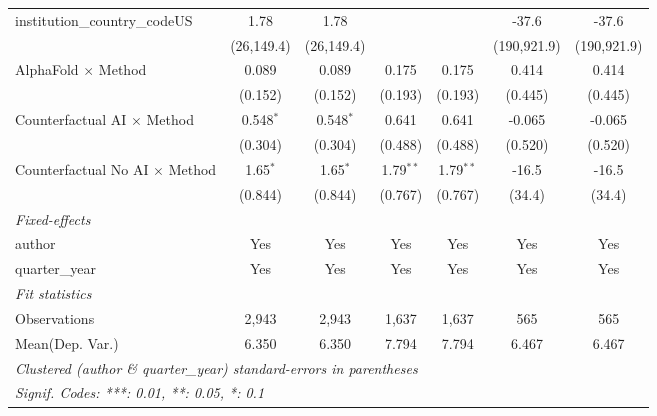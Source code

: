 \begin{tabular}{lcccccc}
   institution\_country\_codeUS          & 1.78         & 1.78         &               &               & -37.6       & -37.6\\   
                                         & (26,149.4)   & (26,149.4)   &               &               & (190,921.9) & (190,921.9)\\   
   AlphaFold $\times$ Method             & 0.089        & 0.089        & 0.175         & 0.175         & 0.414       & 0.414\\   
                                         & (0.152)      & (0.152)      & (0.193)       & (0.193)       & (0.445)     & (0.445)\\   
   Counterfactual AI $\times$ Method     & 0.548$^{*}$  & 0.548$^{*}$  & 0.641         & 0.641         & -0.065      & -0.065\\   
                                         & (0.304)      & (0.304)      & (0.488)       & (0.488)       & (0.520)     & (0.520)\\   
   Counterfactual No AI $\times$ Method  & 1.65$^{*}$   & 1.65$^{*}$   & 1.79$^{**}$   & 1.79$^{**}$   & -16.5       & -16.5\\   
                                         & (0.844)      & (0.844)      & (0.767)       & (0.767)       & (34.4)      & (34.4)\\   
   \midrule
   \emph{Fixed-effects}\\
   author                                & Yes          & Yes          & Yes           & Yes           & Yes         & Yes\\  
   quarter\_year                         & Yes          & Yes          & Yes           & Yes           & Yes         & Yes\\  
   \midrule
   \emph{Fit statistics}\\
   Observations                          & 2,943        & 2,943        & 1,637         & 1,637         & 565         & 565\\  
Mean(Dep. Var.) & 6.350 & 6.350 & 7.794 & 7.794 & 6.467 & 6.467 \\
   \midrule \midrule
   \multicolumn{7}{l}{\emph{Clustered (author \& quarter\_year) standard-errors in parentheses}}\\
   \multicolumn{7}{l}{\emph{Signif. Codes: ***: 0.01, **: 0.05, *: 0.1}}\\
\end{tabular}
\par\endgroup
